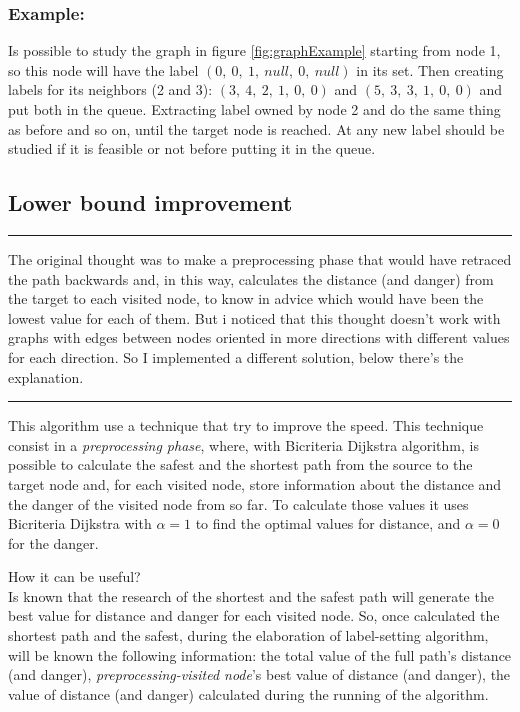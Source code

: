\documentclass[a4paper,11pt]{report}
\begin{document}
\subsubsection*{Example:}
Is possible to study the graph in figure \ref{fig:graphExample} starting from node 1, so this node will have the label $(0,\ 0,\ 1,\ null,\ 0,\ null)$ in its set. Then creating labels for its neighbors (2 and 3): $(3,\ 4,\ 2,\ 1,\ 0,\ 0)$ and $(5,\ 3,\ 3,\ 1,\ 0,\ 0)$ and put both in the queue. Extracting label owned by node 2 and do the same thing as before and so on, until the target node is reached. At any new label should be studied if it is feasible or not before putting it in the queue.

\subsection{Lower bound improvement}
\begin{center}
	\noindent\rule{8cm}{0.1pt}
\end{center}
{\small The original thought was to make a preprocessing phase that would have retraced the path backwards and, in this way, calculates the distance (and danger) from the target to each visited node, to know in advice which would have been the lowest value for each of them. But i noticed that this thought doesn't work with graphs with edges between nodes oriented in more directions with different values for each direction. So I implemented a different solution, below there's the explanation.}
\begin{center}
	\noindent\rule{8cm}{0.1pt}
\end{center}
This algorithm use a technique that try to improve the speed. This technique consist in a \textit{preprocessing phase}, where, with Bicriteria Dijkstra algorithm, is possible to calculate the safest and the shortest path from the source to the target node and, for each visited node, store information about the distance and the danger of the visited node from so far. To calculate those values it uses Bicriteria Dijkstra with $\alpha = 1$ to find the optimal values for distance, and $\alpha = 0$ for the danger.

How it can be useful?
\\
Is known that the research of the shortest and the safest path will generate the best value for distance and danger for each visited node. So, once calculated the shortest path and the safest, during the elaboration of label-setting algorithm, will be known the following information: the total value of the full path's distance (and danger), \textit{preprocessing-visited node}'s best value of distance (and danger), the value of distance (and danger) calculated during the running of the algorithm. 
\end{document}
